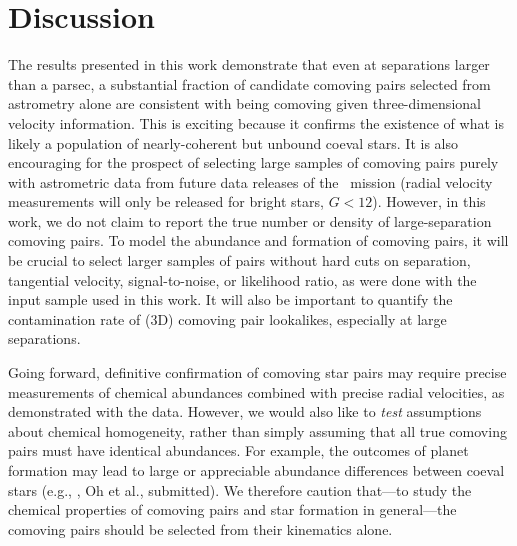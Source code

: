 \documentclass[modern, letterpaper]{aastex61}
\newcommand{\gaia}{\project{Gaia}}
\begin{document}
\section{Discussion} \label{sec:discussion}


The results presented in this work demonstrate that even at separations larger
than a parsec, a substantial fraction of candidate comoving pairs selected from
astrometry alone are consistent with being comoving given three-dimensional
velocity information.
This is exciting because it confirms the existence of what is likely a
population of nearly-coherent but unbound coeval stars.
It is also encouraging for the prospect of selecting large samples of comoving
pairs purely with astrometric data from future data releases of the \gaia\
mission (radial velocity measurements will only be released for bright stars, $G
< 12$).
However, in this work, we do not claim to report the true number or density of
large-separation comoving pairs.
To model the abundance and formation of comoving pairs, it will be crucial to
select larger samples of pairs without hard cuts on separation, tangential
velocity, signal-to-noise, or likelihood ratio, as were done with the input
sample used in this work.
It will also be important to quantify the contamination rate of (3D) comoving
pair lookalikes, especially at large separations.

Going forward, definitive confirmation of comoving star pairs may require
precise measurements of chemical abundances combined with precise radial
velocities, as demonstrated with the \acronym{LAMOST} data.
However, we would also like to \emph{test} assumptions about chemical
homogeneity, rather than simply assuming that all true comoving pairs must have
identical abundances.
For example, the outcomes of planet formation may lead to large or appreciable
abundance differences between coeval stars (e.g., \citealt{Pinsonneault:2001},
Oh et al., submitted).
We therefore caution that---to study the chemical properties of comoving pairs
and star formation in general---the comoving pairs should be selected from their
kinematics alone.

\end{document}
